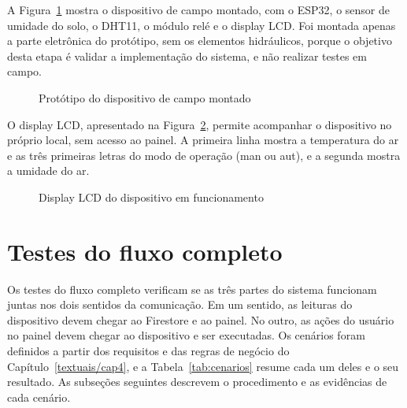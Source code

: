 A Figura~\ref{fig:prototipo} mostra o dispositivo de campo montado, com o ESP32, o sensor de umidade do solo, o DHT11, o módulo relé e o display LCD. Foi montada apenas a parte eletrônica do protótipo, sem os elementos hidráulicos, porque o objetivo desta etapa é validar a implementação do sistema, e não realizar testes em campo.

\begin{figure}[htbp]
  \centering
  \caption{Protótipo do dispositivo de campo montado}
  \label{fig:prototipo}
\end{figure}

O display LCD, apresentado na Figura~\ref{fig:display}, permite acompanhar o dispositivo no próprio local, sem acesso ao painel. A primeira linha mostra a temperatura do ar e as três primeiras letras do modo de operação (man ou aut), e a segunda mostra a umidade do ar.

\begin{figure}[htbp]
  \centering
  \caption{Display LCD do dispositivo em funcionamento}
  \label{fig:display}
\end{figure}

\section{Testes do fluxo completo}
\label{sec:testes-integracao}

Os testes do fluxo completo verificam se as três partes do sistema funcionam juntas nos dois sentidos da comunicação. Em um sentido, as leituras do dispositivo devem chegar ao Firestore e ao painel. No outro, as ações do usuário no painel devem chegar ao dispositivo e ser executadas. Os cenários foram definidos a partir dos requisitos e das regras de negócio do Capítulo~\ref{textuais/cap4}, e a Tabela~\ref{tab:cenarios} resume cada um deles e o seu resultado. As subseções seguintes descrevem o procedimento e as evidências de cada cenário.

